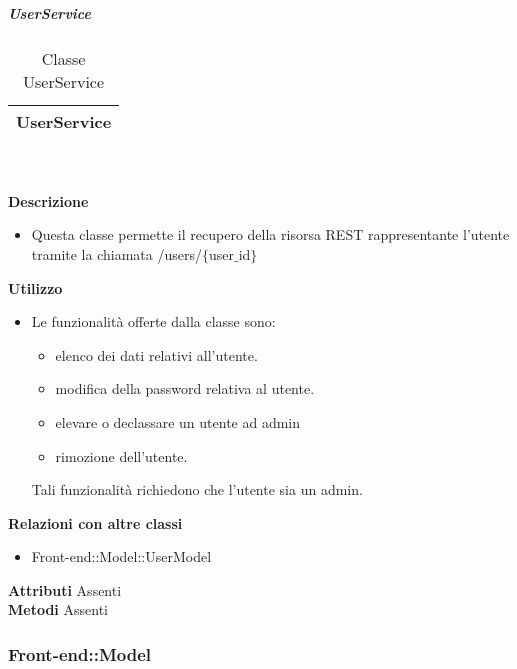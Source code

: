 			\subparagraph{UserService} 
\begin{table}[ht]
\begin{center}
\bgroup
	\setlength{\arrayrulewidth}{0.6mm}
	\def\arraystretch{1}
		\begin{tabular}{ | p{12cm} | }
				\hline  
					\centerline{\textbf{UserService}}
		\\ \hline 
				\hline
				\hline
		
		\end{tabular}
\egroup
\caption{Classe UserService}
\end{center}
\end{table} \textbf{\\ \\ Descrizione}
\begin{itemize}
\item[] Questa classe permette il recupero della risorsa REST rappresentante l'utente tramite la chiamata /users/$\{$user$\_$id$\}$
\end{itemize} 
\textbf{Utilizzo}
\begin{itemize}
\item[] Le funzionalità offerte dalla classe sono: 
\begin{itemize} 
\item elenco dei dati relativi all'utente. 
\item modifica della password relativa al utente.
\item elevare o declassare un utente ad admin 
\item rimozione dell'utente.
\end{itemize}
Tali funzionalità richiedono che l'utente sia un admin.
\end{itemize}
\textbf{Relazioni con altre classi}
\begin{itemize}
\item{Front-end::Model::UserModel}
\end{itemize}
\textbf{Attributi}
Assenti \\
\textbf{Metodi}
Assenti \\

	\subsubsection{Front-end::Model} 
